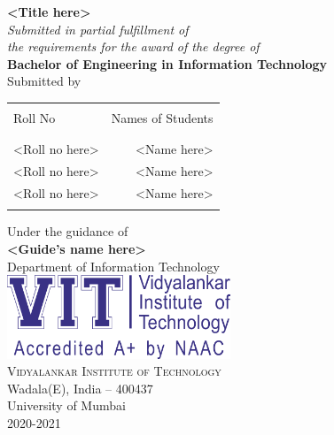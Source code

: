 \begin{titlepage}
       \begin{center}
              \Large \textbf {<Title here>}\\[0.5cm]
              \small \emph{Submitted in partial fulfillment of\\
                     the requirements for the award of the degree of}\\[0.2cm]
              {\bf Bachelor of Engineering in Information Technology}\\[0.5cm]

              \normalsize Submitted by \\
              \begin{table}[h]
                     \centering
                     \begin{tabular}{lr}\hline                         \\
                            Roll No        & Names of Students \\ \\ \hline
                            \\
                            <Roll no here> & <Name here>       \\
                            <Roll no here> & <Name here>       \\
                            <Roll no here> & <Name here>       \\ \\ \hline
                     \end{tabular}
              \end{table}
              \vspace{0.5cm}
              Under the guidance of\\[0.2cm]
              {\textbf{<Guide's name here>}}\\[0.5cm]

              \Large{Department of Information Technology}\\[0.5cm]
              \includegraphics[width=0.50\textwidth]{./vit-logo.png}\\[0.5cm]
              \normalsize \textsc{Vidyalankar Institute of Technology}\\
              Wadala(E), India -- 400437\\[0.5cm]
              \large{University of Mumbai\\
                     2020-2021}
       \end{center}
\end{titlepage}
